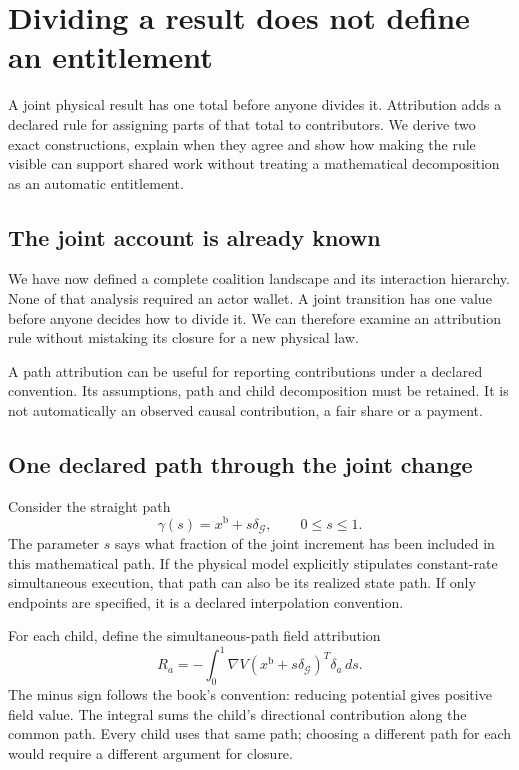 \chapter{Dividing a result does not define an entitlement}\label{ch:attribution}

A joint physical result has one total before anyone divides it. Attribution adds a declared rule for assigning parts of that total to contributors. We derive two exact constructions, explain when they agree and show how making the rule visible can support shared work without treating a mathematical decomposition as an automatic entitlement.


\section{The joint account is already known}
We have now defined a complete coalition landscape and its interaction hierarchy. None of that analysis required an actor wallet. A joint transition has one value before anyone decides how to divide it. We can therefore examine an attribution rule without mistaking its closure for a new physical law.

A path attribution can be useful for reporting contributions under a declared convention. Its assumptions, path and child decomposition must be retained. It is not automatically an observed causal contribution, a fair share or a payment.

\section{One declared path through the joint change}
Consider the straight path
\begin{equation}
 \gamma(s)=x^{\mathrm{b}}+s\delta_{\mathcal G},\qquad 0\le s\le1.
\end{equation}
The parameter $s$ says what fraction of the joint increment has been included in this mathematical path. If the physical model explicitly stipulates constant-rate simultaneous execution, that path can also be its realized state path. If only endpoints are specified, it is a declared interpolation convention.

For each child, define the simultaneous-path field attribution
\begin{equation}\label{eq:path-child}
 R_a=-\int_0^1\nabla V(x^{\mathrm{b}}+s\delta_{\mathcal G})^T\delta_a\,ds.
\end{equation}
The minus sign follows the book's convention: reducing potential gives positive field value. The integral sums the child's directional contribution along the common path. Every child uses that same path; choosing a different path for each would require a different argument for closure.

